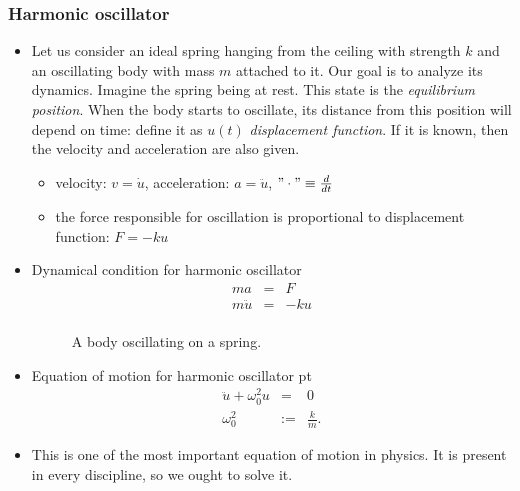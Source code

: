 \documentclass[t,aspectratio=169]{beamer}
\begin{document}
\begin{frame}
  \frametitle{Harmonic oscillator}
  \begin{itemize}
\item Let us consider an ideal spring hanging from the ceiling with strength $k$ and an oscillating body with mass $m$ attached to it. Our goal is to analyze its dynamics. Imagine the spring being at rest. This state is the \emph{equilibrium position}. When the body starts to oscillate, its distance from this position will depend on time: define it as $u(t)$ \emph{displacement function}. If it is known, then the velocity and acceleration are also given.
\begin{itemize}
\item velocity: $v=\dot{u}$, acceleration: $a=\ddot{u}$, $"\cdot"\equiv\frac{d}{dt}$
\item the force responsible for oscillation is proportional to displacement function: $F=-ku$
\end{itemize}
\item Dynamical condition for harmonic oscillator
\begin{eqnarray*}
ma&=&F \\
m\ddot{u}&=&-ku \\
\end{eqnarray*}

\pagebreak
\begin{center}
\begin{figure}
\caption{A body oscillating on a spring.}
\end{figure}
\end{center}
\item Equation of motion for harmonic oscillator
 pt
\begin{eqnarray*}
  \ddot{u}+\omega_{0}^{2}u&=&0 \\
  \omega_{0}^{2}&:=&\frac{k}{m}.
\end{eqnarray*}
\item This is one of the most important equation of motion in physics. It is present in every discipline, so we ought to solve it.


\end{itemize}
\end{frame}
\end{document}
